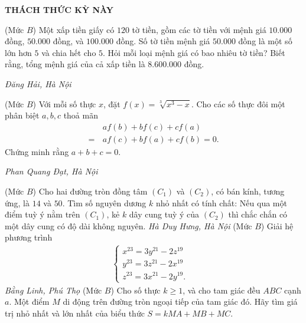 \begin{center}
	\vspace*{-5pt}
	\textbf{\color{thachthuctoanhoc}\color{thachthuctoanhoc}\color{thachthuctoanhoc}THÁCH THỨC KỲ NÀY}
	\vspace*{-5pt}
\end{center}
\begin{multicols}{2}
	\setlength{\abovedisplayskip}{4pt}
	\setlength{\belowdisplayskip}{4pt}
	{}
	(Mức $B$) Một xấp tiền giấy có $120$ tờ tiền, gồm các tờ tiền với mệnh giá $10.000$ đồng, $50.000$ đồng, và $100.000$ đồng. Số tờ tiền mệnh giá $50.000$ đồng là một số lớn hơn $5$ và chia hết cho $5$. Hỏi mỗi loại mệnh giá có bao nhiêu tờ tiền? Biết rằng, tổng mệnh giá của cả xấp tiền là $8.600.000$ đồng.
	\begin{flushright}
		\textit{Đăng Hải, Hà Nội}
	\end{flushright}
	{}
	(Mức $B$) Với mỗi số thực $x$, đặt $f(x)=\sqrt[3]{x^3-x}$. Cho các số thực đôi một phân biệt $a,b,c$ thoả mãn
	\begin{align*}
		&a f(b)+b f(c)+c f(a)\\
		=\,&a f(c)+b f(a)+c f(b)=0.
	\end{align*}
	Chứng minh rằng $a+b+c=0$. 
	\begin{flushright}
		\textit{Phan Quang Đạt, Hà Nội}
	\end{flushright}
	{}
	(Mức $B$) Cho hai đường tròn đồng tâm $(C_1)$ và $(C_2)$, có bán kính, tương ứng, là $14$ và $50$. Tìm số nguyên dương $k$ nhỏ nhất có tính chất: Nếu qua một điểm tuỳ ý nằm trên $(C_1)$, kẻ $k$ dây cung tuỳ ý của $(C_2)$ thì chắc chắn có một dây cung có độ dài không nguyên. 
	\vskip 0.05cm
	\hfill	\textit{Hà Duy Hưng, Hà Nội}
	\vskip 0.05cm
	{}
	(Mức $B$) Giải hệ phương trình
	\begin{align*}
		\begin{cases}
			x^{23}=3y^{21}-2z^{19}&\\
			y^{23}=3z^{21}-2x^{19}&\\
			z^{23}=3x^{21}-2y^{19}.
		\end{cases}
	\end{align*}
	\hfill	\textit{Bằng Linh, Phú Thọ}
	\vskip 0.05cm
	{}
	(Mức $B$) Cho số thực $k\ge1$, và cho tam giác đều $ABC$ cạnh $a$. Một điểm $M$ di động trên đường tròn ngoại tiếp của tam giác đó. Hãy tìm giá trị nhỏ nhất và lớn nhất của biểu thức $S=kMA+MB+MC$.

\end{multicols}
